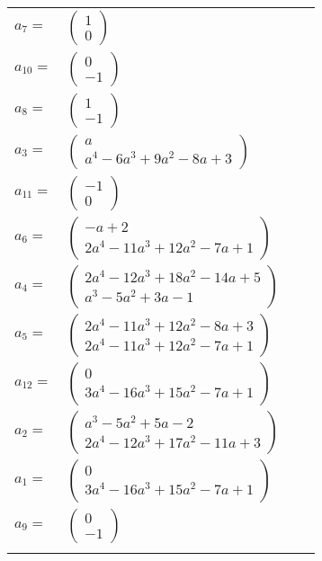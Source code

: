 \documentclass[1p]{elsarticle_modified}
\theoremstyle{definition}
\begin{document}
\begin{tabular}{m{7pt} m{180pt} m{7pt} m{180pt} }
\flushright $a_{7}=$&$\begin{pmatrix}1\\0\end{pmatrix}$ \\
\flushright $a_{10}=$&$\begin{pmatrix}0\\-1\end{pmatrix}$ \\
\flushright $a_{8}=$&$\begin{pmatrix}1\\-1\end{pmatrix}$ \\
\flushright $a_{3}=$&$\begin{pmatrix}a\\a^4-6 a^3+9 a^2-8 a+3\end{pmatrix}$ \\
\flushright $a_{11}=$&$\begin{pmatrix}-1\\0\end{pmatrix}$ \\
\flushright $a_{6}=$&$\begin{pmatrix}- a+2\\2 a^4-11 a^3+12 a^2-7 a+1\end{pmatrix}$ \\
\flushright $a_{4}=$&$\begin{pmatrix}2 a^4-12 a^3+18 a^2-14 a+5\\a^3-5 a^2+3 a-1\end{pmatrix}$ \\
\flushright $a_{5}=$&$\begin{pmatrix}2 a^4-11 a^3+12 a^2-8 a+3\\2 a^4-11 a^3+12 a^2-7 a+1\end{pmatrix}$ \\
\flushright $a_{12}=$&$\begin{pmatrix}0\\3 a^4-16 a^3+15 a^2-7 a+1\end{pmatrix}$ \\
\flushright $a_{2}=$&$\begin{pmatrix}a^3-5 a^2+5 a-2\\2 a^4-12 a^3+17 a^2-11 a+3\end{pmatrix}$ \\
\flushright $a_{1}=$&$\begin{pmatrix}0\\3 a^4-16 a^3+15 a^2-7 a+1\end{pmatrix}$ \\
\flushright $a_{9}=$&$\begin{pmatrix}0\\-1\end{pmatrix}$\\&\end{tabular}
\end{document}
